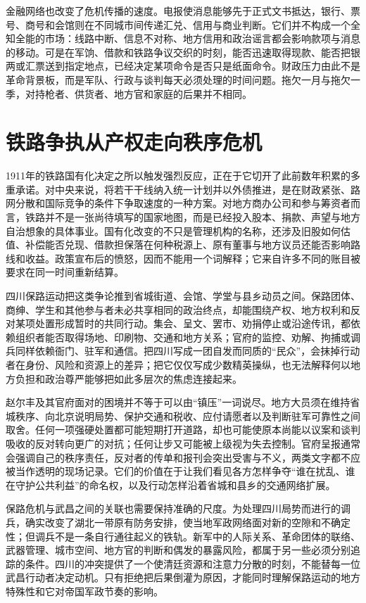 金融网络也改变了危机传播的速度。电报使消息能够先于正式文书抵达，银行、票号、商号和会馆则在不同城市间传递汇兑、信用与商业判断。它们并不构成一个全知全能的市场：线路中断、信息不对称、地方信用和政治谣言都会影响款项与消息的移动。可是在军饷、借款和铁路争议交织的时刻，能否迅速取得现款、能否把银两或汇票送到指定地点，已经决定某项命令是否只是纸面命令。财政压力由此不是革命背景板，而是军队、行政与谈判每天必须处理的时间问题。拖欠一月与拖欠一季，对持枪者、供货者、地方官和家庭的后果并不相同。

\section{铁路争执从产权走向秩序危机}

1911年的铁路国有化决定之所以触发强烈反应，正在于它切开了此前数年积累的多重承诺。对中央来说，将若干干线纳入统一计划并以外债推进，是在财政紧张、路网分散和国际竞争的条件下争取速度的一种方案。对地方商办公司和参与筹资者而言，铁路并不是一张尚待填写的国家地图，而是已经投入股本、捐款、声望与地方自治想象的具体事业。国有化改变的不只是管理机构的名称，还涉及旧股如何估值、补偿能否兑现、借款担保落在何种税源上、原有董事与地方议员还能否影响路线和收益。政策宣布后的愤怒，因而不能用一个词解释；它来自许多不同的账目被要求在同一时间重新结算。

四川保路运动把这类争论推到省城街道、会馆、学堂与县乡动员之间。保路团体、商绅、学生和其他参与者未必共享相同的政治终点，却能围绕产权、地方权利和反对某项处置形成暂时的共同行动。集会、呈文、罢市、劝捐停止或沿途传讯，都依赖组织者能否取得场地、印刷物、交通和地方关系；官府的监控、劝解、拘捕或调兵同样依赖衙门、驻军和通信。把四川写成一团自发而同质的“民众”，会抹掉行动者在身份、风险和资源上的差异；把它仅仅写成少数精英操纵，也无法解释何以地方负担和政治尊严能够把如此多层次的焦虑连接起来。

赵尔丰及其官府面对的困境并不等于可以由“镇压”一词说尽。地方大员须在维持省城秩序、向北京说明局势、保护交通和税收、应付请愿者以及判断驻军可靠性之间取舍。任何一项强硬处置都可能短期打开道路，却也可能使原本尚能以议案和谈判吸收的反对转向更广的对抗；任何让步又可能被上级视为失去控制。官府呈报通常会强调自己的秩序责任，反对者的传单和报刊会突出受害与不义，两类文字都不应被当作透明的现场记录。它们的价值在于让我们看见各方怎样争夺“谁在扰乱、谁在守护公共利益”的命名权，以及行动怎样沿着省城和县乡的交通网络扩展。

保路危机与武昌之间的关联也需要保持准确的尺度。为处理四川局势而进行的调兵，确实改变了湖北一带原有防务安排，使当地军政网络面对新的空隙和不确定性；但调兵不是一条自行通往起义的铁轨。新军中的人际关系、革命团体的联络、武器管理、城市空间、地方官的判断和偶发的暴露风险，都属于另一些必须分别追踪的条件。四川的冲突提供了一个使清廷资源和注意力分散的时刻，不能替每一位武昌行动者决定动机。只有拒绝把后果倒灌为原因，才能同时理解保路运动的地方特殊性和它对帝国军政节奏的影响。

